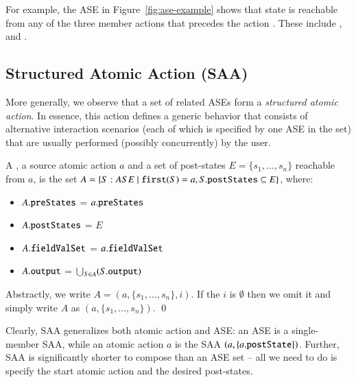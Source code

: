 For example, the ASE in Figure~\ref{fig:ase-example} shows that state  is reachable from any of the three member actions that precedes the action . These include ,  and . 

\subsection{Structured Atomic Action (SAA)} \label{sect:arch-saa}

More generally, we observe that a set of related ASEs form a \textit{structured atomic action}. In essence, this action defines a generic behavior that consists of alternative interaction scenarios (each of which is specified by one ASE in the set) that are usually performed (possibly concurrently) by the user.
%
\begin{definition} \label{def:saa}
	A , \wrt a source atomic action $ a $ and a set of post-states $ E = \{ s_{1},\dots,s_{n} \} $ reachable from $a$, is the set $ A = \{S: ASE ~|~ \func{first}(S) = a, S.\attribn{postStates} \subseteq E \} $, where:
  \begin{itemize}
  \item $A.{\tt preStates}$ = $a.{\tt preStates}$
  \item $A.{\tt postStates}$ = $E$
  \item $A.{\tt fieldValSet}$ = $a.{\tt fieldValSet}$
  \item $A.{\tt output}$ = $\bigcup_{S \in A} (S.{\tt output})$
  \end{itemize}

  Abstractly, we write $ A = (a, \{ s_{1},\dots,s_{n} \}, i) $. If the  $i$ is $\emptyset$ then we omit it and simply write $A$ as $(a, \{ s_{1},\dots,s_{n} \})$. \qed
\end{definition}

Clearly, SAA generalizes both atomic action and ASE: an ASE is a single-member SAA, while an atomic action $ a $ is the SAA 
%
$ (a, \{ a.{\tt postState} \}) $.
%
Further, SAA is significantly shorter to compose than an ASE set -- all we need to do is specify the start atomic action and the desired post-states.

